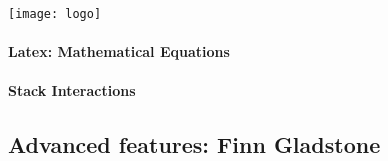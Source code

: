 \documentclass[a4paper, 11pt]{report}
\begin{document}
    \paragraph{}
    \begin{center}
    \texttt{[image: logo]}
    \end{center}

    \paragraph{Latex: Mathematical Equations}


	\paragraph{Stack Interactions}




    \subsection{Advanced features: Finn Gladstone}
\end{document}
